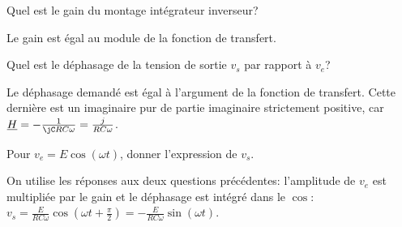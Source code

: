 
\begin{enonce}
  Quel est le gain du montage intégrateur inverseur?
\end{enonce}


\begin{corrigeNewpage}
  Le gain est égal au module de la fonction de transfert.
\end{corrigeNewpage}




\begin{enonce}
  Quel est le déphasage de la tension de sortie \(v_{s}\) par rapport à \(v_{e}\)?
\end{enonce}


\begin{corrige}
  Le déphasage demandé est égal à l’argument de la fonction de transfert. Cette dernière est un imaginaire pur de partie imaginaire strictement positive, car \(\underline{H} = -\frac{1}{\jC RC\omega} = \frac{j}{RC\omega}\).
\end{corrige}




\begin{enonce}
  Pour \(v_{e} = E\cos(\omega t)\), donner l’expression de \(v_{s}\).
\end{enonce}


\begin{corrige}
  On utilise les réponses aux deux questions précédentes: l’amplitude de \(v_{e}\) est multipliée par le gain et le déphasage est intégré dans le \(\cos\): \(v_{s} = \frac{E}{RC\omega}\cos\left(\omega t + \frac{\pi}{2}\right)= -\frac{E}{RC\omega}\sin(\omega t)\).
\end{corrige}



